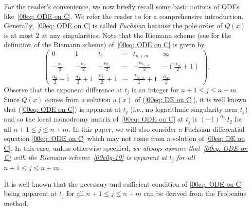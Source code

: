 For the reader's convenience, we now briefly recall some basic notions
of ODEs like~\eqref{00eq: ODE on C}. We refer the reader to
\cite{Yoshida,Whittaker-Watson} for a comprehensive
introduction. Generally,~\eqref{00eq: ODE on C} is called
\emph{Fuchsian} because the pole order of $Q(x)$ is at most $2$ at any
singularities.
Note that the Riemann scheme (see \cite[p.~11]{Yoshida} for the definition of the Riemann scheme) of~\eqref{00eq: ODE on C} is
 given by
\begin{equation}\label{00e0q-10}\begin{pmatrix}
0&1&t_1&\cdots& t_{n+m}&\infty\\
-\frac{{\alpha}_0}{2} &-\frac{{\alpha}_1}{2}&-\frac{{\alpha}_{t_1}}{2}&\cdots&-\frac{{\alpha}_{t_{n+m}}}{2}&-(\frac{{\alpha}_\infty}{2}+1)\\
\frac{{\alpha}_0}{2}+1&\frac{{\alpha}_1}{2}+1&\frac{{\alpha}_{t_1}}{2}+1&\cdots&\frac{{\alpha}_{t_{n+m}}}{2}+1&\frac{{\alpha}_\infty}{2}
\end{pmatrix}.\end{equation}
Observe that the exponent difference at $t_j$ is an integer for
$n+1\leq j\leq n+m$.
Since $Q(x)$ comes from a solution $u(x)$ of (\ref{00eq: DE on C}), it is well known that
(\ref{00eq: ODE on C}) is apparent at $t_j$ \big(i.e., no logarithmic
singularity near $t_j$\big) and so
the local monodromy matrix of~\eqref{00eq: ODE on C} at $t_j$ is
$(-1)^{{\alpha}_{t_j}}I_2$ for all $n+1\leq j\leq n+m$.
In this paper, we will also consider a Fuchsian differential equation
\eqref{00eq: ODE on C} which may not come from a solution of
\eqref{00eq: DE on C}. In this case, unless otherwise specified,
\emph{we always assume that~\eqref{00eq: ODE on C} with the Riemann
 scheme~\eqref{00e0q-10} is apparent at $t_j$ for all $n+1\leq j\leq
 n+m$}.

It is well known that the necessary and sufficient condition of
\eqref{00eq: ODE on C} being apparent at $t_j$ for all $n+1\leq j\leq
n+m$ can be derived from the Frobenius method.

